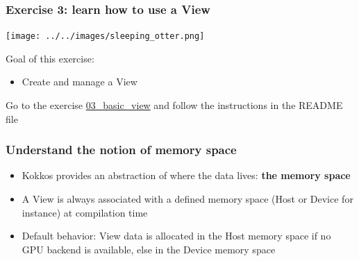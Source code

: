 \documentclass[aspectratio=169]{beamer}
\begin{document}


\begin{frame}[fragile]
    \frametitle{Exercise 3: learn how to use a View} 

    \begin{center}
    \texttt{[image: ../../images/sleeping\_otter.png]}
    \end{center}

    Goal of this exercise:

    \begin{itemize}
        \item Create and manage a View
    \end{itemize}

    \begin{block}{}
        Go to the exercise \href{https://github.com/CExA-project/cexa-kokkos-tutorials/tree/main/exercises/03_basic_view}{03\_basic\_view} and follow the instructions in the README file
    \end{block}

\end{frame}


\begin{frame}[fragile]
    \frametitle{Understand the notion of memory space}

\begin{itemize}
    \item Kokkos provides an abstraction of where the data lives: \textbf{the memory space}
    \item A View is always associated with a defined memory space (Host or Device for instance) at compilation time
    \item Default behavior: View data is allocated in the Host memory space if no GPU backend is available, else in the Device memory space
\end{itemize}
\end{frame}

\end{document}
